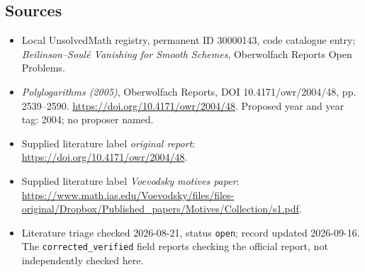 \documentclass[11pt]{article}
\begin{document}
\subsection{Sources}
\begin{itemize}\item Local UnsolvedMath registry, permanent ID 30000143, code catalogue entry; \emph{Beilinson--Soul\'e Vanishing for Smooth Schemes}, Oberwolfach Reports Open Problems.\item \emph{Polylogarithms (2005)}, Oberwolfach Reports, DOI 10.4171/owr/2004/48, pp. 2539--2590. \url{https://doi.org/10.4171/owr/2004/48}. Proposed year and year tag: 2004; no proposer named.\item Supplied literature label \emph{original report}: \url{https://doi.org/10.4171/owr/2004/48}.\item Supplied literature label \emph{Voevodsky motives paper}: \url{https://www.math.ias.edu/Voevodsky/files/files-original/Dropbox/Published_papers/Motives/Collection/s1.pdf}.\item Literature triage checked 2026-08-21, status \texttt{open}; record updated 2026-09-16. The \texttt{corrected\_verified} field reports checking the official report, not independently checked here.\end{itemize}
\end{document}
